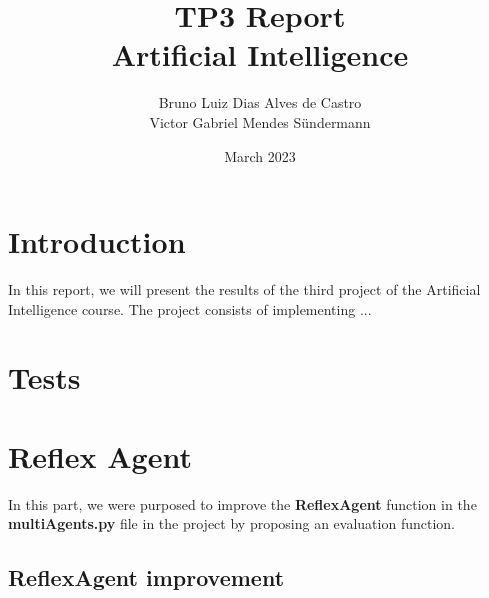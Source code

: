 \documentclass{article}
\title{\huge TP3 Report \\ Artificial Intelligence}
\author{Bruno Luiz Dias Alves de Castro \\ Victor Gabriel Mendes Sündermann}
\date{March 2023}
\begin{document}
\maketitle

\section{Introduction}

In this report, we will present the results of the third project of the Artificial Intelligence course. The project consists of implementing ...

\section{Tests}

\section{Reflex Agent}

In this part, we were purposed to improve the \textbf{ReflexAgent} function in the \textbf{multiAgents.py} file in the project by proposing an evaluation function.

\subsection{ReflexAgent improvement}
\end{document}
